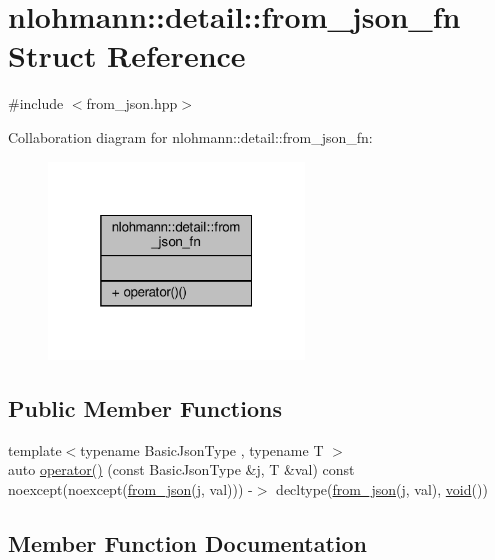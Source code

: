 \hypertarget{structnlohmann_1_1detail_1_1from__json__fn}{}\section{nlohmann\+:\+:detail\+:\+:from\+\_\+json\+\_\+fn Struct Reference}
\label{structnlohmann_1_1detail_1_1from__json__fn}


{\ttfamily \#include $<$from\+\_\+json.\+hpp$>$}



Collaboration diagram for nlohmann\+:\+:detail\+:\+:from\+\_\+json\+\_\+fn\+:
\nopagebreak
\begin{figure}[H]
\begin{center}
\leavevmode
\includegraphics[width=193pt]{structnlohmann_1_1detail_1_1from__json__fn__coll__graph}
\end{center}
\end{figure}
\subsection*{Public Member Functions}
\begin{DoxyCompactItemize}
\item 
{\footnotesize template$<$typename Basic\+Json\+Type , typename T $>$ }\\auto \hyperlink{structnlohmann_1_1detail_1_1from__json__fn_a6d14a74e1043072c77892534572d2973}{operator()} (const Basic\+Json\+Type \&j, T \&val) const noexcept(noexcept(\hyperlink{namespacenlohmann_1_1detail_a1f0395aad0fe853a4539288749d3a603}{from\+\_\+json}(j, val))) -\/$>$ decltype(\hyperlink{namespacenlohmann_1_1detail_a1f0395aad0fe853a4539288749d3a603}{from\+\_\+json}(j, val), \hyperlink{namespacenlohmann_1_1detail_a59fca69799f6b9e366710cb9043aa77d}{void}())
\end{DoxyCompactItemize}


\subsection{Member Function Documentation}
\mbox{\label{structnlohmann_1_1detail_1_1from__json__fn_a6d14a74e1043072c77892534572d2973}} 
